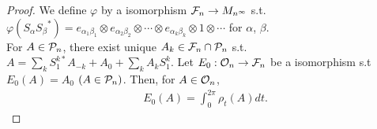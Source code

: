 \begin{proof}
  
  We define $\varphi$ by a isomorphism $\F_n \rightarrow M_{n^\infty}$ s.t. $\varphi(S_\alpha {S_\beta}^*) = e_{{\alpha}_1 \beta_1} \otimes e_{\alpha_2 \beta_2} \otimes \cdots \otimes e_{\alpha_k \beta_k} \otimes 1 \otimes \cdots$ for $\alpha$, $\beta$.  \\
  For $A \in \P_n $, there exist unique $A_k \in \F_n \cap \P_n$ s.t. $A = \sum_k S_1^{k*}A_{-k} + A_0 + \sum_k A_kS_1^k$.
  Let $E_0 : \O_n \rightarrow \F_n$ be a isomorphism s.t $E_0(A) = A_0$ $(A \in \P_n)$.
  Then, for $A \in \O_n$, 
  \begin{align*}
    E_0(A) = \int_0^{2\pi}\rho_t(A)dt.
  \end{align*}
  
\end{proof}
